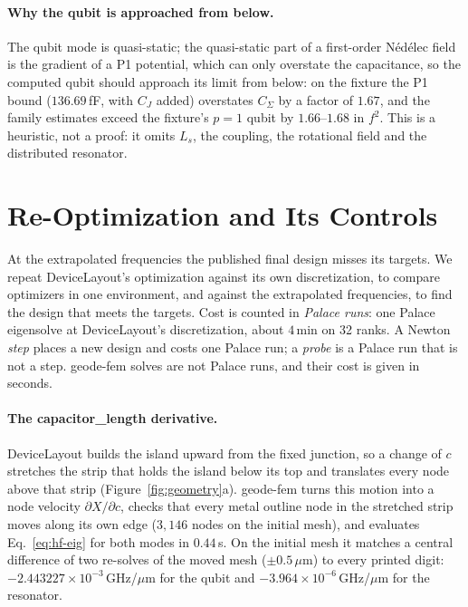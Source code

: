 \documentclass{anvil-paper}
\begin{document}
\paragraph{Why the qubit is approached from below.}
The qubit mode is quasi-static; the quasi-static part of a first-order
N\'ed\'elec field is the gradient of a P1 potential, which can only
overstate the capacitance, so the computed qubit should approach its limit
from below: on the fixture the P1 bound ($136.69$\,fF, with $C_J$ added)
overstates $C_\Sigma$ by a factor of $1.67$, and the family estimates exceed
the fixture's $p = 1$ qubit by $1.66$--$1.68$ in $f^2$. This is a heuristic, not a proof: it omits $L_s$,
the coupling, the rotational field and the distributed resonator.

\section{Re-Optimization and Its Controls}
\label{sec:reopt}

At the extrapolated frequencies the published final design misses its
targets. We repeat DeviceLayout's optimization against its own
discretization, to compare optimizers in one environment, and against the
extrapolated frequencies, to find the design that meets the targets.
Cost is counted in \emph{Palace runs}: one Palace eigensolve at
DeviceLayout's discretization, about $4$\,min on 32 ranks. A Newton
\emph{step} places a new design and costs one Palace run; a \emph{probe}
is a Palace run that is not a step. geode-fem solves are not Palace runs,
and their cost is given in seconds.

\paragraph{The capacitor\_length derivative.}
DeviceLayout builds the island upward from the fixed junction, so a change
of $c$ stretches the strip that holds the island below its top and
translates every node above that strip (Figure~\ref{fig:geometry}a).
geode-fem turns this motion into a node velocity
$\partial X/\partial c$, checks that every metal outline node in the
stretched strip moves along its own edge ($3{,}146$ nodes on the initial
mesh), and evaluates Eq.~\eqref{eq:hf-eig} for both modes in $0.44$\,s.
On the initial mesh it matches a central
difference of two re-solves of the moved mesh ($\pm0.5\,\mu$m) to every
printed digit: $-2.443227\times10^{-3}$\,GHz/$\mu$m for the qubit and
$-3.964\times10^{-6}$\,GHz/$\mu$m for the resonator.
\end{document}

